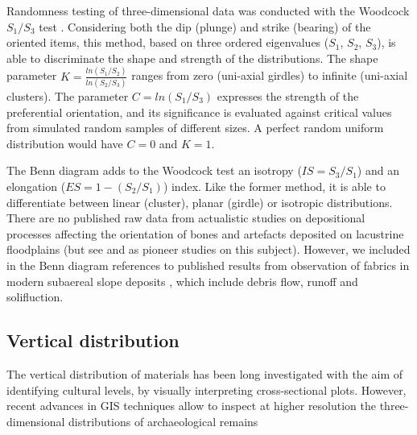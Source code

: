 \documentclass[preprint,authoryear,times]{elsarticle} %
\begin{document}
Randomness testing of three-dimensional data was conducted with the Woodcock $S_1/S_3$ test \citep{Woodcock1983}. Considering both the dip (plunge) and strike (bearing) of the oriented items, this method, based on three ordered eigenvalues ($S_1$, $S_2$, $S_3$), is able to discriminate the shape and strength of the distributions. The shape parameter $K=\frac{ln(S_1/S_2)}{ln(S_2/S_3)}$ ranges from zero (uni-axial girdles) to infinite (uni-axial clusters). The parameter $C=ln(S_1/S_3)$ expresses the strength of the preferential orientation, and its significance is evaluated against critical values from simulated random samples of different sizes. A perfect random uniform distribution would have $C=0$ and $K=1$.

The Benn \citep{Benn1994} diagram adds to the Woodcock test an isotropy ($IS=S_3/S_1$) and an elongation ($ES=1-(S_2/S_1)$) index. Like the former method, it is able to differentiate between linear (cluster), planar (girdle) or isotropic distributions. There are no published raw data from actualistic studies on depositional processes affecting the orientation of bones and artefacts deposited on lacustrine floodplains (but see \cite{Morton2004} and \cite{Cobo-Sanchez2014} as pioneer studies on this subject). However, we included in the Benn diagram references to published results from observation of fabrics in modern subaereal slope deposits \citep{Bertran1997,Lenoble2004}, which include debris flow, runoff and solifluction.

\subsection{Vertical distribution}

The vertical distribution of materials has been long investigated with the aim of identifying cultural levels, by visually interpreting cross-sectional plots. However, recent advances in GIS techniques allow to inspect at higher resolution the three-dimensional distributions of archaeological remains \citep[][among others]{McPherron2005a,Anderson2008}

\end{document}
